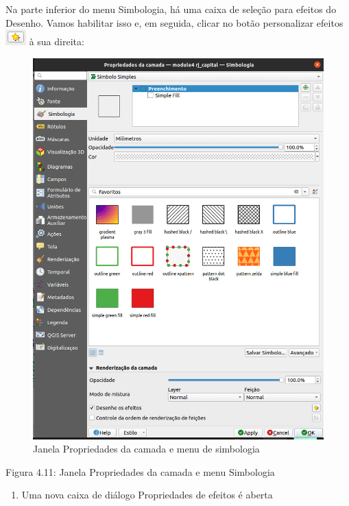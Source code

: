 \documentclass[
]{krantz}
\providecommand{\tightlist}{%
  \setlength{\itemsep}{0pt}\setlength{\parskip}{0pt}}
\begin{document}
Na parte inferior do menu Simbologia, há uma caixa de seleção para efeitos do Desenho. Vamos habilitar isso e, em seguida, clicar no botão personalizar efeitos \includegraphics{media/modulo4/customise-effects-button.png} à sua direita:

\begin{figure}
\centering
\includegraphics{media/modulo4/draw-effects.png}
\caption{Janela Propriedades da camada e menu de simbologia}
\end{figure}

Figura 4.11: Janela Propriedades da camada e menu Simbologia

\begin{enumerate}
\def\labelenumi{\arabic{enumi}.}
\setcounter{enumi}{2}
\tightlist
\item
  Uma nova caixa de diálogo Propriedades de efeitos é aberta
\end{enumerate}
\end{document}

